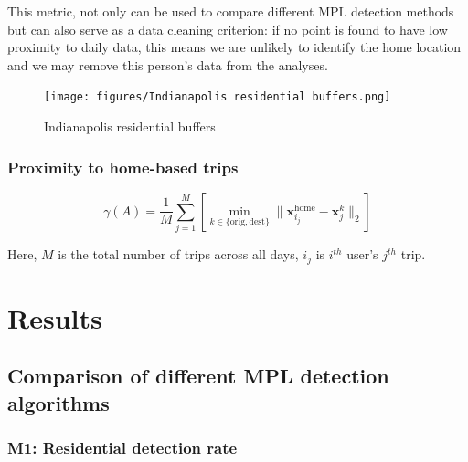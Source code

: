 \documentclass[pdflatex,sn-mathphys,lineno]{sn-jnl}%
\theoremstyle{thmstyleone}%
\theoremstyle{thmstyletwo}%
\theoremstyle{thmstylethree}%
\begin{document}
This metric, not only can be used to compare different MPL detection methods but can also serve as a data cleaning criterion: if no point is found to have low proximity to daily data, this means we are unlikely to identify the home location and we may remove this person’s data from the analyses.

\begin{figure}[ht]
    \centering
    \texttt{[image: figures/Indianapolis residential buffers.png]}
    \caption{Indianapolis residential buffers}
    \label{fig:my_label3}
\end{figure}

\subsubsection{Proximity to home-based trips}

\begin{equation}
    \gamma(A) = \frac{1}{M} \sum_{j=1}^M \left[ \min_{k\in\{\text{orig},\text{dest}\}} \lVert \mathbf{x}_{i_j}^{\text{home}} - \mathbf{x}_j^k \rVert_2 \right]
\end{equation}

Here, $M$ is the total number of trips across all days, $i_j$ is $i^{th}$ user's $j^{th}$ trip.

\section{Results}


\subsection{Comparison of different MPL detection algorithms}

\subsubsection{M1: Residential detection rate}
\end{document}
